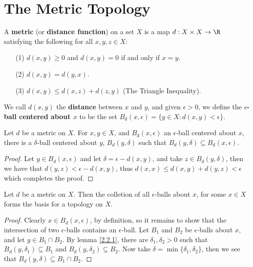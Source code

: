 
\section{The Metric Topology}

\begin{definition}
    A \textbf{metric} (or \textbf{distance function}) on a set $X$ is a map
    $d:X \times X \rightarrow \R$ satisfying the following for all $x,y,z \in X$:
        \begin{enumerate}
            \item[(1)] $d(x,y) \geq 0$ and $d(x,y)=0$ if and only if $x=y$.

            \item[(2)] $d(x,y)=d(y,x)$.

            \item[(3)]$d(x,y) \leq d(x,z)+d(z,y)$ (The Triangle Inequality).
        \end{enumerate}
        We call $d(x,y)$ the \textbf{distance} between $x$ and  $y$, and given
        $\epsilon>0$, we define the  \textbf{$\epsilon$-ball centered about $x$}
        to be the set $B_d(x,\epsilon)=\{y \in X: d(x,y)<\epsilon\}$.
\end{definition}

\begin{lemma}\label{2.2.1}
    Let $d$ be a metric on  $X$. For  $x,y \in X$, and  $B_d(x,\epsilon)$ an
    $\epsilon$-ball centered about  $x$, there is a  $\delta$-ball centered about
    $y$, $B_d(y,\delta)$ such that $B_d(y,\delta) \subseteq B_d(x,\epsilon)$.
\end{lemma}
\begin{proof}
    Let $y \in B_d(x,\epsilon)$ and let $\delta=\epsilon-d(x,y)$, and take $z
    \in B_d(y,\delta)$, then we have that $d(y,z)<\epsilon-d(x,y)$, thus $d(x,x)
    \leq d (x,y)+d(y,z)<\epsilon$ which completes the proof.
\end{proof}

\begin{theorem}\label{2.2.2}
    Let $d$ be a metric on  $X$. Then the colletion of all  $\epsilon$-balls about
    $x$, for some $x \in X$ forms the basis for a topology on  $X$.
\end{theorem}
\begin{proof}
    Clearly $x \in B_d(x,\epsilon)$, by definition, so it remains to show that
    the intersection of two $\epsilon$-balls contains an  $\epsilon$-ball. Let
    $B_1$ and $B_2$ be $\epsilon$-balls about  $x$, and let  $y \in B_1 \cap B_2$.
    By lemma \ref{2.2.1}, there are $\delta_1,\delta_2>0$ such that
    $B_d(y,\delta_1) \subseteq B_1$ and $B_d(y,\delta_2) \subseteq B_2$. Now
    take $\delta=\min\{\delta_1, \delta_2\}$, then we see that $B_d(y,\delta)
    \subseteq B_1 \cap B_2$.
\end{proof}

